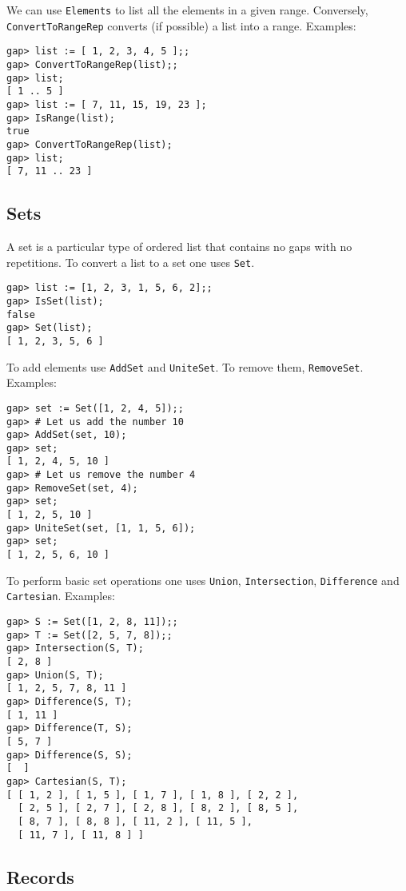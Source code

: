 We can use \lstinline{Elements} to list all the elements in a given range.
Conversely, \lstinline{ConvertToRangeRep} converts (if possible) a list into a
range.  Examples:
\begin{lstlisting}
gap> list := [ 1, 2, 3, 4, 5 ];;
gap> ConvertToRangeRep(list);;
gap> list;
[ 1 .. 5 ]
gap> list := [ 7, 11, 15, 19, 23 ];
gap> IsRange(list);
true
gap> ConvertToRangeRep(list);
gap> list;
[ 7, 11 .. 23 ]
\end{lstlisting}

\subsection*{Sets} 

A set is a particular type of ordered list that contains no gaps with no
repetitions.  To convert a list to a set one uses \lstinline{Set}.  
\begin{lstlisting}
gap> list := [1, 2, 3, 1, 5, 6, 2];;
gap> IsSet(list);
false
gap> Set(list);
[ 1, 2, 3, 5, 6 ]
\end{lstlisting}

To add elements use 
\lstinline{AddSet} and \lstinline{UniteSet}. To remove them, 
\lstinline{RemoveSet}. Examples:
\begin{lstlisting}
gap> set := Set([1, 2, 4, 5]);;
gap> # Let us add the number 10 
gap> AddSet(set, 10);
gap> set;
[ 1, 2, 4, 5, 10 ]
gap> # Let us remove the number 4 
gap> RemoveSet(set, 4);
gap> set;
[ 1, 2, 5, 10 ]
gap> UniteSet(set, [1, 1, 5, 6]);
gap> set;
[ 1, 2, 5, 6, 10 ]
\end{lstlisting}
To perform basic set operations one uses
\lstinline{Union}, \lstinline{Intersection},
\lstinline{Difference} and \lstinline{Cartesian}. Examples: 
\begin{lstlisting}
gap> S := Set([1, 2, 8, 11]);;
gap> T := Set([2, 5, 7, 8]);;
gap> Intersection(S, T);
[ 2, 8 ]
gap> Union(S, T);
[ 1, 2, 5, 7, 8, 11 ]
gap> Difference(S, T);
[ 1, 11 ]
gap> Difference(T, S);
[ 5, 7 ]
gap> Difference(S, S);
[  ]
gap> Cartesian(S, T);
[ [ 1, 2 ], [ 1, 5 ], [ 1, 7 ], [ 1, 8 ], [ 2, 2 ], 
  [ 2, 5 ], [ 2, 7 ], [ 2, 8 ], [ 8, 2 ], [ 8, 5 ], 
  [ 8, 7 ], [ 8, 8 ], [ 11, 2 ], [ 11, 5 ], 
  [ 11, 7 ], [ 11, 8 ] ]
\end{lstlisting}

\subsection*{Records}

